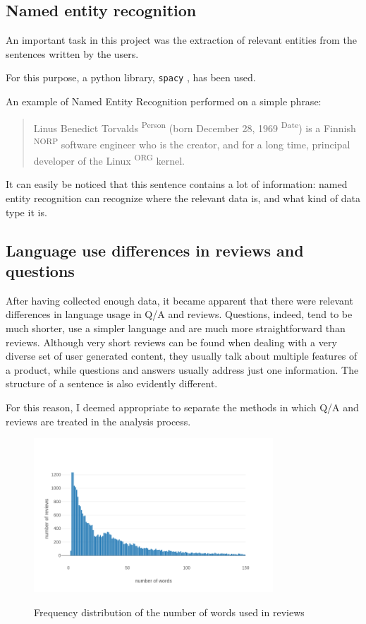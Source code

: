 \documentclass[LaM,oneside,binding=0.6cm]{sapthesis}
\begin{document}
\subsection{Named entity recognition}

An important task in this project was the extraction of relevant entities from the sentences written by the users.

For this purpose, a python library, \texttt{spacy} \parencite{noauthor_spacy_nodate}, has been used.

An example of Named Entity Recognition performed on a simple phrase:
\begin{quote}
Linus Benedict Torvalds \textsuperscript{Person} (born December 28, 1969 \textsuperscript{Date}) is a Finnish \textsuperscript{NORP} software engineer who is the creator, and for a long time, principal developer of the Linux \textsuperscript{ORG} kernel.
\end{quote}

It can easily be noticed that this sentence contains a lot of information: named entity recognition can recognize where the relevant data is, and what kind of data type it is.

\subsection{Language use differences in reviews and questions}

After having collected enough data, it became apparent that there were relevant differences in language usage in Q/A and reviews. Questions, indeed, tend to be much shorter, use a simpler language and are much more straightforward than reviews. Although very short reviews can be found when dealing with a very diverse set of user generated content, they usually talk about multiple features of a product, while questions and answers usually address just one information. The structure of a sentence is also evidently different.

For this reason, I deemed appropriate to separate the methods in which Q/A and reviews are treated in the analysis process.

\begin{figure}
\centering
\includegraphics[width=0.8\textwidth]{pictures/reviews_freq_dist.png}\\[3ex]
\caption{Frequency distribution of the number of words used in reviews}
\label{fig:rev-freq-dist}
\end{figure}
\end{document}
